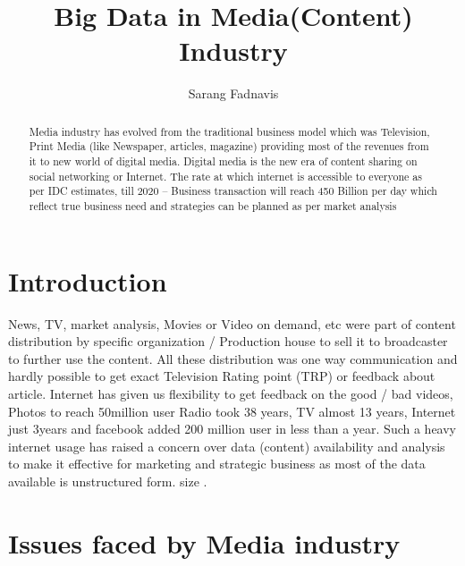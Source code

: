 \documentclass[sigconf]{acmart}
\begin{document}
\title{Big Data in Media(Content) Industry}


\author{Sarang Fadnavis}

\begin{abstract}
Media industry has evolved from the traditional business model which was Television, Print Media (like Newspaper, articles, magazine) providing most of the revenues from it to new world of digital media. Digital media is the new era of content sharing on social networking or Internet. The rate at which internet is accessible to everyone as per IDC estimates, till 2020 – Business transaction will reach 450 Billion per day which reflect true business need and strategies can be planned as per market analysis 
\end{abstract}


\maketitle

\section{Introduction}

News, TV, market analysis, Movies or Video on demand, etc were part of content distribution by specific organization / Production house to sell it to broadcaster to further use the content. All these distribution was one way communication and hardly possible to get exact Television Rating point (TRP) or feedback about article. Internet has given us flexibility to get feedback on the good / bad videos, Photos to reach 50million user Radio took 38 years, TV almost 13 years, Internet just 3years and facebook added 200 million user in less than a year. 
Such a heavy internet usage has raised a concern over data (content) availability and analysis to make it effective for marketing and strategic business as most of the data available is unstructured form. 
size \cite{Teaches}.

\section{Issues faced by Media industry}
\end{document}
